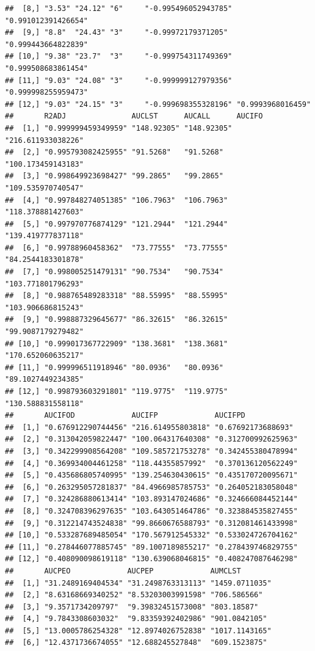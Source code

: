 \documentclass[]{krantz}
\theoremstyle{definition}
\theoremstyle{definition}
\theoremstyle{definition}
\theoremstyle{remark}
\begin{document}
\begin{verbatim}
##  [8,] "3.53" "24.12" "6"     "-0.995496052943785" "0.991012391426654"
##  [9,] "8.8"  "24.43" "3"     "-0.99972179371205"  "0.999443664822839"
## [10,] "9.38" "23.7"  "3"     "-0.999754311749369" "0.999508683861454"
## [11,] "9.03" "24.08" "3"     "-0.999999127979356" "0.999998255959473"
## [12,] "9.03" "24.15" "3"     "-0.999698355328196" "0.9993968016459"  
##       R2ADJ               AUCLST      AUCALL      AUCIFO            
##  [1,] "0.999999459349959" "148.92305" "148.92305" "216.611933038226"
##  [2,] "0.995793082425955" "91.5268"   "91.5268"   "100.173459143183"
##  [3,] "0.998649923698427" "99.2865"   "99.2865"   "109.535970740547"
##  [4,] "0.997848274051385" "106.7963"  "106.7963"  "118.378881427603"
##  [5,] "0.997970776874129" "121.2944"  "121.2944"  "139.419777837118"
##  [6,] "0.99788960458362"  "73.77555"  "73.77555"  "84.2544183301878"
##  [7,] "0.998005251479131" "90.7534"   "90.7534"   "103.771801796293"
##  [8,] "0.988765489283318" "88.55995"  "88.55995"  "103.906686815243"
##  [9,] "0.998887329645677" "86.32615"  "86.32615"  "99.9087179279482"
## [10,] "0.999017367722909" "138.3681"  "138.3681"  "170.652060635217"
## [11,] "0.999996511918946" "80.0936"   "80.0936"   "89.1027449234385"
## [12,] "0.998793603291801" "119.9775"  "119.9775"  "130.588831558118"
##       AUCIFOD             AUCIFP             AUCIFPD            
##  [1,] "0.676912290744456" "216.614955803818" "0.67692173688693" 
##  [2,] "0.313042059822447" "100.064317640308" "0.312700992625963"
##  [3,] "0.342299908564208" "109.585721753278" "0.342455380478994"
##  [4,] "0.369934004461258" "118.44355857992"  "0.370136120562249"
##  [5,] "0.435686805740995" "139.254630430615" "0.435170720095671"
##  [6,] "0.263295057281837" "84.4966985785753" "0.264052183058048"
##  [7,] "0.324286880613414" "103.893147024686" "0.324666084452144"
##  [8,] "0.324708396297635" "103.643051464786" "0.323884535827455"
##  [9,] "0.312214743524838" "99.8660676588793" "0.312081461433998"
## [10,] "0.533287689485054" "170.567912545332" "0.533024726704162"
## [11,] "0.278446077885745" "89.1007189855217" "0.278439746829755"
## [12,] "0.408090098619118" "130.639068046815" "0.408247087646298"
##       AUCPEO             AUCPEP             AUMCLST       
##  [1,] "31.2489169404534" "31.2498763313113" "1459.0711035"
##  [2,] "8.63168669340252" "8.53203003991598" "706.586566"  
##  [3,] "9.3571734209797"  "9.39832451573008" "803.18587"   
##  [4,] "9.7843308603032"  "9.83359392402986" "901.0842105" 
##  [5,] "13.0005786254328" "12.8974026752838" "1017.1143165"
##  [6,] "12.4371736674055" "12.688245527848"  "609.1523875" 

\end{verbatim}
\end{document}

